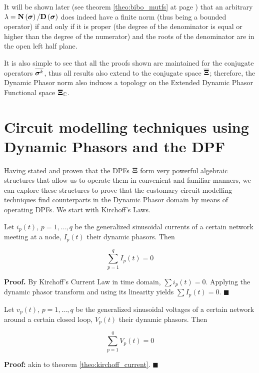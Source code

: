 	It will be shown later (see theorem \ref{theo:bibo_mutfs} at page \pageref{theo:bibo_mutfs}) that an arbitrary $\lambda = \mathbf{N}\left(\boldsymbol{\sigma}\right)/\mathbf{D}\left(\boldsymbol{\sigma}\right)$ does indeed have a finite norm (thus being a bounded operator) if and only if it is proper (the degree of the denominator is equal or higher than the degree of the numerator) and the roots of the denominator are in the open left half plane.

	It is also simple to see that all the proofs shown are maintained for the conjugate operators $\overline{\boldsymbol{\sigma}^{k}}$, thus all results also extend to the conjugate space $\overline{\boldsymbol{\Xi}}$; therefore, the Dynamic Phasor norm also induces a topology on the Extended Dynamic Phasor Functional space $\boldsymbol{\Xi}_\mathbb{C}$.

\section{Circuit modelling techniques using Dynamic Phasors and the DPF} %

	Having stated and proven that the DPFs $\boldsymbol{\Xi}$ form very powerful algebraic structures that allow us to operate them in convenient and familiar manners, we can explore these structures to prove that the customary circuit modelling techniques find counterparts in the Dynamic Phasor domain by means of operating DPFs. We start with Kirchoff's Laws.

\begin{theorem} \label{theo:kirchoff_current}
Let $i_p(t)$, $p = 1,...,q$ be the generalized sinusoidal currents of a certain network meeting at a node, $I_p(t)$ their dynamic phasors. Then

\begin{equation} \sum\limits_{p=1}^q I_p(t) = 0 \end{equation}

\end{theorem}
\noindent \textbf{Proof.} By Kirchoff's Current Law in time domain, $\sum i_p(t) = 0$. Applying the dynamic phasor transform and using its linearity yields $\sum I_p(t) = 0$. \hfill$\blacksquare$
	
\begin{theorem} \label{theo:kirchoff_voltage}
Let $v_p(t)$, $p = 1,...,q$ be the generalized sinusoidal voltages of a certain network around a certain closed loop, $V_p(t)$ their dynamic phasors. Then

\begin{equation} \sum\limits_{p=1}^q V_p(t) = 0 \end{equation}

\end{theorem}
\noindent \textbf{Proof:} akin to theorem \ref{theo:kirchoff_current}. \hfill$\blacksquare$

